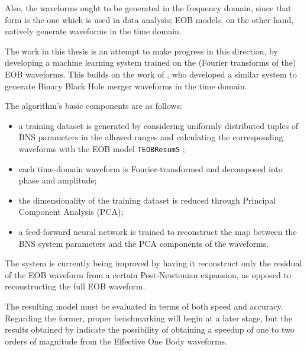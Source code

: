 \documentclass[11pt]{article}
\begin{document}
Also, the waveforms ought to be generated in the frequency domain, since that form is the one which is used in data analysis;
EOB models, on the other hand, natively generate waveforms in the time domain. 

The work in this thesis is an attempt to make progress in this direction, by developing a machine learning system trained on the (Fourier transforms of the) EOB waveforms. 
This builds on the work of \textcite{schmidtMachineLearningGravitational2020}, who developed a similar system to generate Binary Black Hole merger waveforms in the time domain.

The algorithm's basic components are as follows:
\begin{itemize}
    \item a training dataset is generated by considering uniformly distributed tuples of BNS parameters in the allowed ranges and calculating the corresponding waveforms with the EOB model \texttt{TEOBResumS} \cite[]{nagarTimedomainEffectiveonebodyGravitational2018};
    \item each time-domain waveform is Fourier-transformed and decomposed into phase and amplitude;
    \item the dimensionality of the training dataset is reduced through Principal Component Analysis (PCA);
    \item a feed-forward neural network is trained to reconstruct the map between the BNS system parameters and the PCA components of the waveforms. 
\end{itemize}

The system is currently being improved by having it reconstruct only the residual of the EOB waveform from a certain Post-Newtonian expansion, as opposed to reconstructing the full EOB waveform. 

The resulting model must be evaluated in terms of both speed and accuracy.
Regarding the former, proper benchmarking will begin at a later stage, but the results obtained by \textcite[]{schmidtMachineLearningGravitational2020} indicate the possibility of obtaining a speedup of one to two orders of magnitude from the Effective One Body waveforms. 
\end{document}

